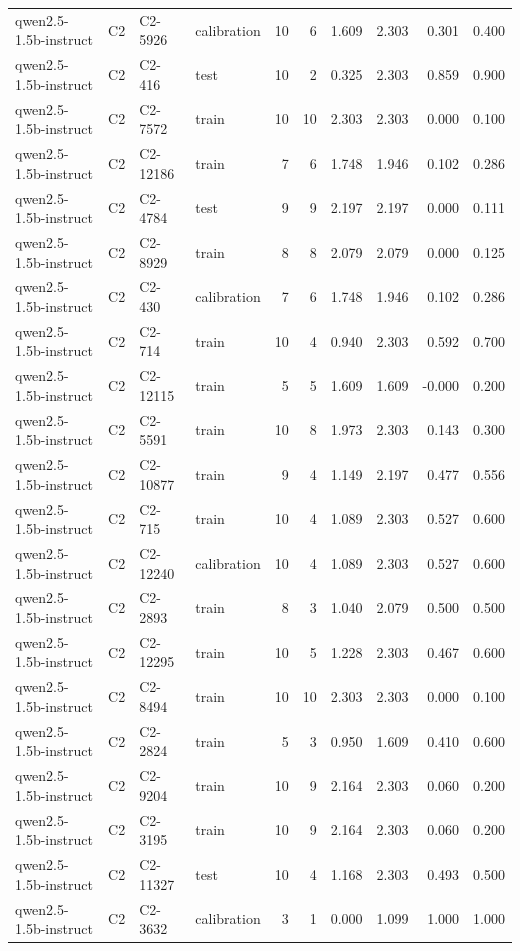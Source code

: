 \begin{table}
\begin{tabular}{llllrrrrrr}
qwen2.5-1.5b-instruct & C2 & C2-5926 & calibration & 10 & 6 & 1.609 & 2.303 & 0.301 & 0.400 \\
qwen2.5-1.5b-instruct & C2 & C2-416 & test & 10 & 2 & 0.325 & 2.303 & 0.859 & 0.900 \\
qwen2.5-1.5b-instruct & C2 & C2-7572 & train & 10 & 10 & 2.303 & 2.303 & 0.000 & 0.100 \\
qwen2.5-1.5b-instruct & C2 & C2-12186 & train & 7 & 6 & 1.748 & 1.946 & 0.102 & 0.286 \\
qwen2.5-1.5b-instruct & C2 & C2-4784 & test & 9 & 9 & 2.197 & 2.197 & 0.000 & 0.111 \\
qwen2.5-1.5b-instruct & C2 & C2-8929 & train & 8 & 8 & 2.079 & 2.079 & 0.000 & 0.125 \\
qwen2.5-1.5b-instruct & C2 & C2-430 & calibration & 7 & 6 & 1.748 & 1.946 & 0.102 & 0.286 \\
qwen2.5-1.5b-instruct & C2 & C2-714 & train & 10 & 4 & 0.940 & 2.303 & 0.592 & 0.700 \\
qwen2.5-1.5b-instruct & C2 & C2-12115 & train & 5 & 5 & 1.609 & 1.609 & -0.000 & 0.200 \\
qwen2.5-1.5b-instruct & C2 & C2-5591 & train & 10 & 8 & 1.973 & 2.303 & 0.143 & 0.300 \\
qwen2.5-1.5b-instruct & C2 & C2-10877 & train & 9 & 4 & 1.149 & 2.197 & 0.477 & 0.556 \\
qwen2.5-1.5b-instruct & C2 & C2-715 & train & 10 & 4 & 1.089 & 2.303 & 0.527 & 0.600 \\
qwen2.5-1.5b-instruct & C2 & C2-12240 & calibration & 10 & 4 & 1.089 & 2.303 & 0.527 & 0.600 \\
qwen2.5-1.5b-instruct & C2 & C2-2893 & train & 8 & 3 & 1.040 & 2.079 & 0.500 & 0.500 \\
qwen2.5-1.5b-instruct & C2 & C2-12295 & train & 10 & 5 & 1.228 & 2.303 & 0.467 & 0.600 \\
qwen2.5-1.5b-instruct & C2 & C2-8494 & train & 10 & 10 & 2.303 & 2.303 & 0.000 & 0.100 \\
qwen2.5-1.5b-instruct & C2 & C2-2824 & train & 5 & 3 & 0.950 & 1.609 & 0.410 & 0.600 \\
qwen2.5-1.5b-instruct & C2 & C2-9204 & train & 10 & 9 & 2.164 & 2.303 & 0.060 & 0.200 \\
qwen2.5-1.5b-instruct & C2 & C2-3195 & train & 10 & 9 & 2.164 & 2.303 & 0.060 & 0.200 \\
qwen2.5-1.5b-instruct & C2 & C2-11327 & test & 10 & 4 & 1.168 & 2.303 & 0.493 & 0.500 \\
qwen2.5-1.5b-instruct & C2 & C2-3632 & calibration & 3 & 1 & 0.000 & 1.099 & 1.000 & 1.000 \\

\end{tabular}
\end{table}
